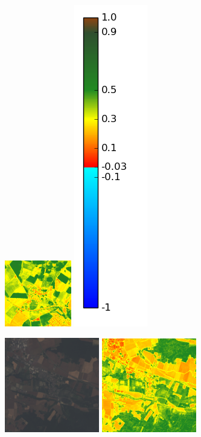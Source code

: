 \documentclass{book}
\begin{document}
\begin{figure}[H]
{\includegraphics[scale=1.1]{../3_ndvi/images/Fontenay-en-Parisis/07_ndvi.png}
\includegraphics[scale=0.3]{../3_ndvi/images/colormap.png}
}
\centerline{
\includegraphics[scale=1.1]{../3_ndvi/images/Malay-le-Grand/07_rgb.png}
\includegraphics[scale=1.1]{../3_ndvi/images/Malay-le-Grand/07_ndvi.png}
}
\end{figure}
\end{document}

